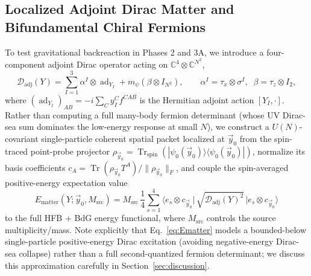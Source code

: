 \documentclass[11pt,a4paper]{article}
\DeclareMathOperator{\Tr}{Tr}
\begin{document}
\subsection{Localized Adjoint Dirac Matter and Bifundamental Chiral Fermions}
To test gravitational backreaction in Phases 2 and 3A, we introduce a four-component adjoint Dirac operator acting on $\mathbb{C}^4 \otimes \mathbb{C}^{N^2}$,
\begin{equation}
  \mathcal{D}_{\mathrm{adj}}(Y) = \sum_{I=1}^{3} \alpha^I \otimes \operatorname{ad}_{Y_I} + m_\psi (\beta \otimes I_{N^2}),
  \qquad \alpha^I = \tau_x \otimes \sigma^I,\;\; \beta = \tau_z \otimes I_2,
  \label{eq:Dadj}
\end{equation}
where $(\operatorname{ad}_{Y_I})_{AB} = -i \sum_C y_I^C f^{CAB}$ is the Hermitian adjoint action $[Y_I, \cdot]$. Rather than computing a full many-body fermion determinant (whose UV Dirac-sea sum dominates the low-energy response at small $N$), we construct a $U(N)$-covariant single-particle coherent spatial packet localized at $\vec{y}_0$ from the spin-traced point-probe projector $\rho_{\vec{y}_0} = \Tr_{\mathrm{spin}}(|\psi_0(\vec{y}_0)\rangle\langle\psi_0(\vec{y}_0)|)$, normalize its basis coefficients $c_A = \Tr(\rho_{\vec{y}_0} T^A)/\|\rho_{\vec{y}_0}\|_F$, and couple the spin-averaged positive-energy expectation value
\begin{equation}
  E_{\mathrm{matter}}(Y; \vec{y}_0, M_{\mathrm{src}})
  = M_{\mathrm{src}}\,\frac{1}{4}\sum_{s=1}^{4} \bigl\langle e_s \otimes c_{\vec{y}_0} \big|\, \sqrt{\mathcal{D}_{\mathrm{adj}}(Y)^2} \,\big| e_s \otimes c_{\vec{y}_0} \bigr\rangle
  \label{eq:Ematter}
\end{equation}
to the full HFB + BdG energy functional, where $M_{\mathrm{src}}$ controls the source multiplicity/mass. Note explicitly that Eq.~\eqref{eq:Ematter} models a bounded-below single-particle positive-energy Dirac excitation (avoiding negative-energy Dirac-sea collapse) rather than a full second-quantized fermion determinant; we discuss this approximation carefully in Section~\ref{sec:discussion}.
\end{document}
